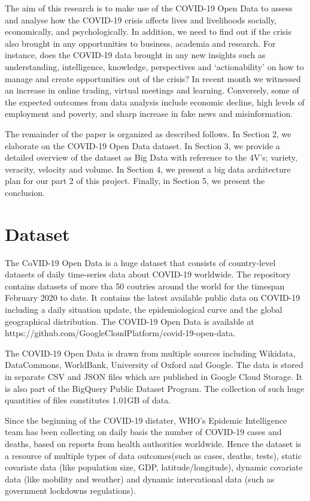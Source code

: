 \documentclass[12pt,letterpaper, twoside]{article}
\begin{document}
The aim of this research is to make use of the COVID-19 Open Data to assess and analyse how the COVID-19 crisis affects lives and livelihoods socially, economically, and psychologically. In addition, we need to find out if the crisis also brought in any opportunities to business, academia and research.  For instance, does the COVID-19 data brought in any new insights such as understanding, intelligence, knowledge, perspectives and ‘actionability’ on how to manage and create opportunities out of the crisis? In recent month we witnessed an increase in online trading, virtual meetings and learning.  Conversely, some of the expected outcomes from data analysis include economic decline, high levels of employment and poverty, and sharp increase in fake news and misinformation.

The remainder of the paper is organized as described follows. In Section 2, we elaborate on the COVID-19 Open Data dataset. In Section 3, we provide a detailed overview of the dataset as Big Data with reference to the 4V's; variety, veracity, velocity and volume.  In Section 4, we present a big data architecture plan for our part 2 of this project. Finally, in Section 5, we present the conclusion.

\section{Dataset} 
The CoVID-19 Open Data is a huge dataset that consists of country-level datasets of daily time-series data about COVID-19 worldwide. The repository contains datasets of more tha 50 coutries around the world for the timespan February 2020 to date. It contains the latest available public data on COVID-19 including a daily situation update, the epidemiological curve and the global geographical distribution. The COVID-19 Open Data is available at https://github.com/GoogleCloudPlatform/covid-19-open-data.

The COVID-19 Open Data is drawn from multiple sources including Wikidata, DataCommons, WorldBank, University of Oxford and Google. The data is stored in separate CSV and JSON files which are published in Google Cloud Storage. It is also part of the BigQuery Public Dataset Program. The collection of such huge quantities of files constitutes 1.01GB of data. 

Since the beginning of the  COVID-19 distater, WHO's Epidemic Intelligence team has been collecting on daily basis the number of COVID-19 cases and deaths, based on reports from health authorities worldwide. Hence the dataset is a resource of multiple types of data outcomes(such as cases, deaths, tests), static covariate data (like population size, GDP, latitude/longitude), dynamic covariate data (like mobility and weather) and dynamic intervational data (such as government lockdowns regulations). 
\end{document}
